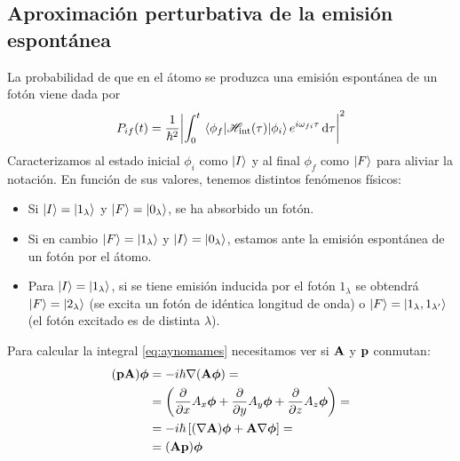 \subsection{Aproximación perturbativa de la emisión espontánea}
La probabilidad de que en el átomo se produzca una emisión espontánea
de un fotón viene dada por
\begin{equation}
  P_{if}(t) = \frac{1}{\hbar^2} \abs{\int_0^t
    \mel{\phi_f}{\mathscr{H}_\text{int}(\tau)}{\phi_i} e^{i\omega_{fi}\tau}\dd{\tau} }^2 
  \label{eq:probaif}
\end{equation}
Caracterizamos al estado inicial $\phi_i$ como $\ket{I}$ y al final
$\phi_f$ como $\ket{F}$ para aliviar la notación. En función de sus
valores, tenemos distintos fenómenos físicos:
\begin{itemize}
\item Si $\ket{I}=\ket{1_\lambda}$ y
  $\ket{F}=\ket{0_\lambda}$, se ha absorbido un fotón.
\item Si en cambio $\ket{F}=\ket{1_\lambda}$ y
  $\ket{I}=\ket{0_\lambda}$, estamos ante la emisión
  espontánea de un fotón por el átomo.
\item Para $\ket{I}=\ket{1_\lambda}$, si se tiene
  emisión inducida por el fotón $1_\lambda$ se obtendrá
  $\ket{F}=\ket{2_\lambda}$ (se excita un fotón de
  idéntica longitud de onda) o
  $\ket{F}=\ket{1_\lambda,1_{\lambda'}}$ (el fotón
  excitado es de distinta $\lambda$).
\end{itemize}

Para calcular la integral \eqref{eq:aynomames} necesitamos ver si
$\bm{\mathrm{A}}$ y $\bm{\mathrm{p}}$ conmutan:
\begin{equation}
  \begin{split}
    (\bm{\mathrm{p}}\bm{\mathrm{A}}) \bm{\mathrm{\phi}} &= -i \hbar \nabla (\bm{\mathrm{A}}\bm{\mathrm{\phi}}) =
    \\
    &= \left( \pdv{x} A_x\bm{\mathrm{\phi}} +  \pdv{y} A_y\bm{\mathrm{\phi}}+ \pdv{z} A_z\bm{\mathrm{\phi}}
    \right) =\\
    &= -i \hbar \left[ (\nabla \bm{\mathrm{A}})\bm{\mathrm{\phi}}+ \bm{\mathrm{A}}\nabla \bm{\mathrm{\phi}}
    \right] = \\
    &= (\bm{\mathrm{A}}\bm{\mathrm{p}})\bm{\mathrm{\phi}} 
  \end{split}
\end{equation}

